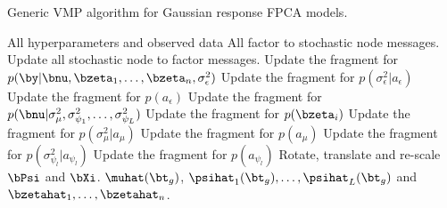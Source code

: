 \documentclass[12pt]{article}
\def\sigsqeps{\sigma^2_{\epsilon}}
\def\aeps{a_{\epsilon}}
\def\sigsqmu{\sigma^2_{\mu}}
\def\amu{a_{\mu}}
\newcommand\sigsqpsi[1]{\sigma^2_{\psi_{#1}}}
\newcommand\apsi[1]{a_{\psi_{#1}}}
\theoremstyle{plain}
\theoremstyle{definition}
\theoremstyle{remark}
\begin{document}
\begin{algorithm}
	\caption{
		Generic VMP algorithm for Gaussian response FPCA models.
	}
	\label{alg:vmp_alg}
	\begin{algorithmic}[1]
		\Inputs All hyperparameters and observed data
		\Initialize All factor to stochastic node messages.
		\Updates
				\State Update all stochastic node to factor messages.
				\State Update the fragment for $p (\by | \bnu, \bzeta_1, \dots, \bzeta_n, \sigsqeps)$
				\State Update the fragment for $p (\sigsqeps | \aeps)$
				\State Update the fragment for $p (\aeps)$
				\State Update the fragment for $p (\bnu | \sigsqmu, \sigsqpsi{1}, \dots, \sigsqpsi{L})$
					\State Update the fragment for $p (\bzeta_i)$
				\EndFor
				\State Update the fragment for $p (\sigsqmu | \amu)$
				\State Update the fragment for $p (\amu)$
					\State Update the fragment for $p (\sigsqpsi{l} | \apsi{l})$
					\State Update the fragment for $p (\apsi{l})$
				\EndFor
			\EndWhile
			\State Rotate, translate and re-scale $\bPsi$ and $\bXi$.
		\Outputs $\muhat (\bt_g)$, $\psihat_1 (\bt_g), \dots, \psihat_L (\bt_g)$ and $\bzetahat_1, \dots, \bzetahat_n$.
	\end{algorithmic}
\end{algorithm}
\end{document}
